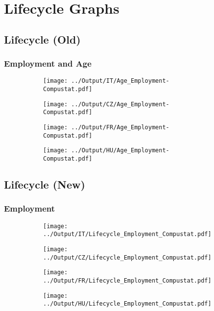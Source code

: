 \documentclass[12pt,notitlepage]{article}
\begin{document}
\section{Lifecycle Graphs}
\subsection{Lifecycle (Old)}
\subsubsection{Employment and Age}
\begin{figure}[!htpb]
\centering
\caption{Distribution of employment across firm age}
\begin{subfigure}{.49\textwidth}
    \centering
 \texttt{[image: ../Output/IT/Age\_Employment-Compustat.pdf]}
\end{subfigure}%
\begin{subfigure}{.49\textwidth}
    \centering
 \texttt{[image: ../Output/CZ/Age\_Employment-Compustat.pdf]}
\end{subfigure}
\begin{subfigure}{.49\textwidth}
    \centering
 \texttt{[image: ../Output/FR/Age\_Employment-Compustat.pdf]}
\end{subfigure}%
\begin{subfigure}{.49\textwidth}
    \centering
 \texttt{[image: ../Output/HU/Age\_Employment-Compustat.pdf]}
\end{subfigure}
\end{figure}
\pagebreak

\subsection{Lifecycle (New)}
\subsubsection{Employment}
\begin{figure}[!htpb]
\centering
\caption{Employment (Average)}
\begin{subfigure}{.49\textwidth}
    \centering
 \texttt{[image: ../Output/IT/Lifecycle\_Employment\_Compustat.pdf]}
\end{subfigure}%
\begin{subfigure}{.49\textwidth}
    \centering
 \texttt{[image: ../Output/CZ/Lifecycle\_Employment\_Compustat.pdf]}
\end{subfigure}
\begin{subfigure}{.49\textwidth}
    \centering
 \texttt{[image: ../Output/FR/Lifecycle\_Employment\_Compustat.pdf]}
\end{subfigure}%
\begin{subfigure}{.49\textwidth}
    \centering
 \texttt{[image: ../Output/HU/Lifecycle\_Employment\_Compustat.pdf]}
\end{subfigure}
\end{figure}
\pagebreak
\end{document}
